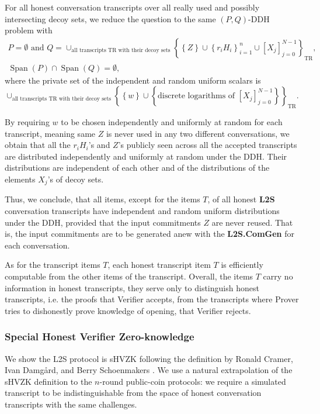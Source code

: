 \documentclass{mathcryptology} %
\DeclareMathOperator{\Span}{Span}
\theoremstyle{title}
\theoremstyle{titleof}
\begin{document}
    For all honest conversation transcripts over all really used and possibly intersecting decoy sets, we reduce the question to the same $\left(P,Q\right)$-DDH problem with
    \begin{gather*}
        P = \emptyset \text{ and }
        Q = {\cup}_{\text{all transcripts TR with their decoy sets}}
            {\left\{\left\{Z\right\} \cup {\left\{r_{i}H_{i}\right\}}_{i=1}^{n} \cup {\left[X_{j}\right]}_{j=0}^{N-1}\right\}}_{\text{TR}},\\
        \Span\left(P\right) \cap \Span\left(Q\right) = \emptyset,
    \end{gather*}
    where the private set of the independent and random uniform scalars is
    \begin{equation*}
        {\cup}_{\text{all transcripts TR with their decoy sets}}
        {\left\{\left\{ w \right\} {\cup} \left\{\text{discrete logarithms of ${\left[X_{j}\right]}_{j=0}^{N-1}$} \right\}\right\}}_{\text{TR}}.
    \end{equation*}

    By requiring $w$ to be chosen independently and uniformly at random for each transcript, meaning same $Z$ is never used in any two different conversations, we obtain that all the $r_{i}H_{i}$'s and $Z$'s publicly seen across all the accepted transcripts are distributed independently and uniformly at random under the DDH. Their distributions are independent of each other and of the distributions of the elements $X_{j}$'s of decoy sets.

    Thus, we conclude, that all items, except for the items $T$, of all honest \textbf{L2S} conversation transcripts have independent and random uniform distributions under the DDH, provided that the input commitments $Z$ are never reused. That is, the input commitments are to be generated anew with the \textbf{L2S.ComGen} for each conversation.

    As for the transcript items $T$, each honest transcript item $T$ is efficiently computable from the other items of the transcript. Overall, the items $T$ carry no information in honest transcripts, they serve only to distinguish honest transcripts, i.e. the proofs that Verifier accepts, from the transcripts where Prover tries to dishonestly prove knowledge of opening, that Verifier rejects.


\subsubsection{Special Honest Verifier Zero-knowledge}\label{Sec:6.3.4.}
    We show the L2S protocol is sHVZK following the definition by Ronald Cramer, Ivan Damgård, and Berry Schoenmakers \cite{5}. We use a natural extrapolation of the sHVZK definition to the $n$-round public-coin protocols: we require a simulated transcript to be indistinguishable from the space of honest conversation transcripts with the same challenges.
\end{document}
